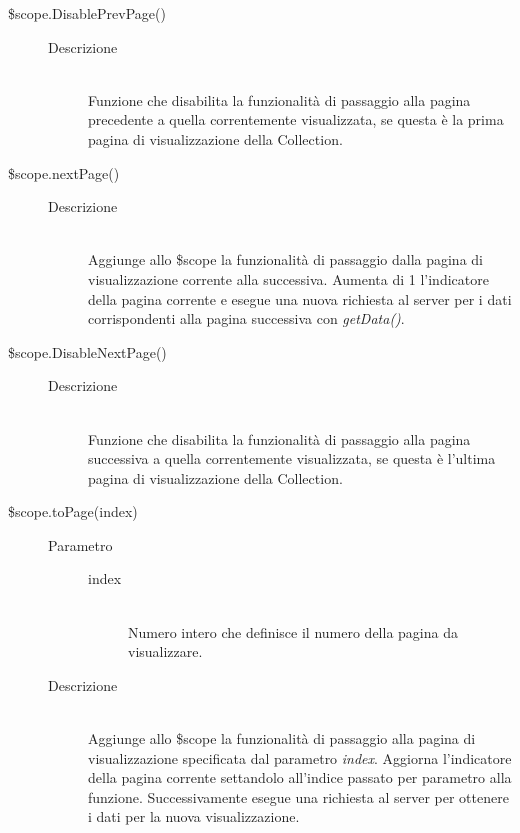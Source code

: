 \begin{description}
\begin{description}
  \item[\$scope.DisablePrevPage()] \hfill
  \begin{description}
  	\item[Descrizione] \hfill \\
  	Funzione che disabilita la funzionalità di passaggio alla pagina precedente a quella correntemente visualizzata, se questa è la prima pagina di visualizzazione della Collection.
  \end{description}
  
  \item[\$scope.nextPage()] \hfill
  \begin{description}
  		\item[Descrizione] \hfill \\
  Aggiunge allo \$scope la funzionalità di passaggio dalla pagina di visualizzazione corrente alla successiva. Aumenta di 1 l'indicatore della pagina corrente e esegue una nuova richiesta al server per i dati corrispondenti alla pagina successiva con \textit{getData()}.
  \end{description}
  
  \item[\$scope.DisableNextPage()] \hfill
  \begin{description}
  	\item[Descrizione] \hfill \\
  	Funzione che disabilita la funzionalità di passaggio alla pagina successiva a quella correntemente visualizzata, se questa è l'ultima pagina di visualizzazione della Collection.
  \end{description}
  
  \item[\$scope.toPage(index)] \hfill
  \begin{description}
  	\item[Parametro] \hfill
  	\begin{description}
  		\item[index] \hfill \\
  		Numero intero che definisce il numero della pagina da visualizzare.
  	\end{description}
  	\item[Descrizione] \hfill \\
  Aggiunge allo \$scope la funzionalità di passaggio alla pagina di visualizzazione specificata dal parametro \textit{index}. Aggiorna l'indicatore della pagina corrente settandolo all'indice passato per parametro alla funzione. Successivamente esegue una richiesta al server per ottenere i dati per la nuova visualizzazione.
  \end{description}
 \end{description}
\end{description}

